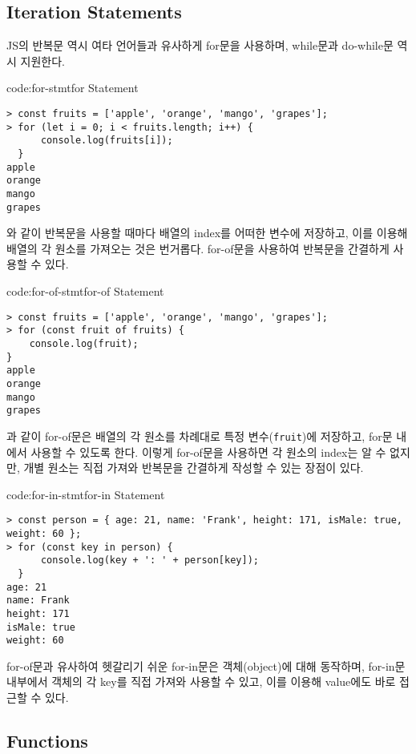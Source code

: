 \subsection*{Iteration Statements}

JS의 반복문 역시 여타 언어들과 유사하게 for문을 사용하며, while문과 do-while문 역시 지원한다.

\begin{codeenv}{code:for-stmt}{for Statement}\begin{verbatim}
> const fruits = ['apple', 'orange', 'mango', 'grapes'];
> for (let i = 0; i < fruits.length; i++) {
      console.log(fruits[i]);
  }
apple
orange
mango
grapes
\end{verbatim}
\end{codeenv}

와 같이 반복문을 사용할 때마다 배열의 index를 어떠한 변수에 저장하고, 이를 이용해 배열의 각 원소를 가져오는 것은 번거롭다. for-of문을 사용하여 반복문을 간결하게 사용할 수 있다.

\begin{codeenv}{code:for-of-stmt}{for-of Statement}\begin{verbatim}
> const fruits = ['apple', 'orange', 'mango', 'grapes'];
> for (const fruit of fruits) {
    console.log(fruit);
}
apple
orange
mango
grapes
\end{verbatim}
\end{codeenv}

과 같이 for-of문은 배열의 각 원소를 차례대로 특정 변수(\texttt{fruit})에 저장하고, for문 내에서 사용할 수 있도록 한다. 이렇게 for-of문을 사용하면 각 원소의 index는 알 수 없지만, 개별 원소는 직접 가져와 반복문을 간결하게 작성할 수 있는 장점이 있다.

\begin{codeenv}{code:for-in-stmt}{for-in Statement}\begin{verbatim}
> const person = { age: 21, name: 'Frank', height: 171, isMale: true, weight: 60 };
> for (const key in person) {
      console.log(key + ': ' + person[key]);
  }
age: 21
name: Frank
height: 171
isMale: true
weight: 60
\end{verbatim}
\end{codeenv}

for-of문과 유사하여 헷갈리기 쉬운 for-in문은 객체(object)에 대해 동작하며, for-in문 내부에서 객체의 각 key를 직접 가져와 사용할 수 있고, 이를 이용해 value에도 바로 접근할 수 있다.

\subsection*{Functions}

